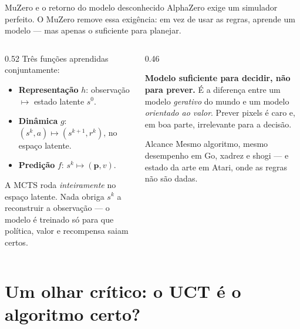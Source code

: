 \documentclass[aspectratio=169, 10pt]{beamer}
\begin{document}
\begin{frame}{MuZero e o retorno do modelo desconhecido}
  \small
  AlphaZero exige um simulador perfeito. O MuZero remove essa exigência: em vez de
  usar as regras, \alert{aprende} um modelo --- mas apenas o suficiente para
  planejar.

  \begin{columns}[T]
    \begin{column}{0.52\textwidth}
      Três funções aprendidas conjuntamente:
      \begin{itemize}
        \item \textbf{Representação} $h$: observação $\mapsto$ estado latente $s^0$.
        \item \textbf{Dinâmica} $g$: $(s^k, a) \mapsto (s^{k+1}, r^k)$, no espaço
              latente.
        \item \textbf{Predição} $f$: $s^k \mapsto (\bm{p}, v)$.
      \end{itemize}
      \medskip
      A MCTS roda \emph{inteiramente} no espaço latente. Nada obriga $s^k$ a
      reconstruir a observação --- o modelo é treinado só para que política, valor
      e recompensa saiam certos.
    \end{column}
    \begin{column}{0.46\textwidth}
      \begin{ideiabox}
        \textbf{Modelo suficiente para decidir, não para prever.} É a diferença
        entre um modelo \emph{gerativo} do mundo e um modelo \emph{orientado ao
        valor}. Prever pixels é caro e, em boa parte, irrelevante para a decisão.
      \end{ideiabox}
      \begin{defbox}{Alcance}
        Mesmo algoritmo, mesmo desempenho em Go, xadrez e shogi --- e estado da
        arte em Atari, onde as regras não são dadas.
      \end{defbox}
    \end{column}
  \end{columns}
\end{frame}

\section{Um olhar crítico: o UCT é o algoritmo certo?}
\end{document}
